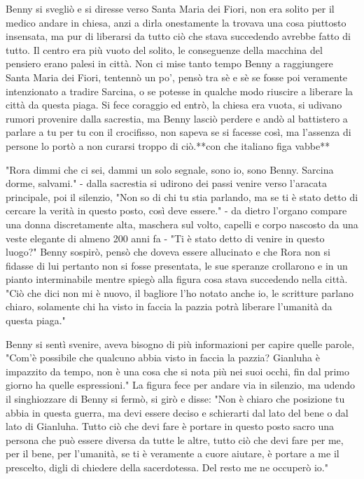 Benny si svegliò e si diresse verso Santa Maria dei Fiori, non era solito per il medico andare in chiesa, anzi a dirla onestamente la trovava una cosa piuttosto insensata, ma pur di liberarsi da tutto ciò che stava succedendo avrebbe fatto di tutto. Il centro era più vuoto del solito, le conseguenze della macchina del pensiero erano palesi in città. Non ci mise tanto tempo Benny a raggiungere Santa Maria dei Fiori, tentennò un po', pensò tra sè e sè se fosse poi veramente intenzionato a tradire Sarcina, o se potesse in qualche modo riuscire a liberare la città da questa piaga. Si fece coraggio ed entrò, la chiesa era vuota, si udivano rumori provenire dalla sacrestia, ma Benny lasciò perdere e andò al battistero a parlare a tu per tu con il crocifisso, non sapeva se si facesse così, ma l'assenza di persone lo portò a non curarsi troppo di ciò.**con che italiano figa vabbe**

"Rora dimmi che ci sei, dammi un solo segnale, sono io, sono Benny. Sarcina dorme, salvami." - dalla sacrestia si udirono dei passi venire verso l'aracata principale, poi il silenzio, "Non so di chi tu stia parlando, ma se ti è stato detto di cercare la verità in questo posto, così deve essere." - da dietro l'organo compare una donna discretamente alta, maschera sul volto, capelli e corpo nascosto da una veste elegante di almeno 200 anni fa - "Ti è stato detto di venire in questo luogo?" 
Benny sospirò, pensò che doveva essere allucinato e che Rora non si fidasse di lui pertanto non si fosse presentata, le sue speranze crollarono e in un pianto interminabile mentre spiegò alla figura cosa stava succedendo nella città.
"Ciò che dici non mi è nuovo, il bagliore l'ho notato anche io, le scritture parlano chiaro, solamente chi ha visto in faccia la pazzia potrà liberare l'umanità da questa piaga."

Benny si sentì svenire, aveva bisogno di più informazioni per capire quelle parole, "Com'è possibile che qualcuno abbia visto in faccia la pazzia? Gianluha è impazzito da tempo, non è una cosa che si nota più nei suoi occhi, fin dal primo giorno ha quelle espressioni."
La figura fece per andare via in silenzio, ma udendo il singhiozzare di Benny si fermò, si girò e disse: "Non è chiaro che posizione tu abbia in questa guerra, ma devi essere deciso e schierarti dal lato del bene o dal lato di Gianluha. Tutto ciò che devi fare è portare in questo posto sacro una persona che può essere diversa da tutte le altre, tutto ciò che devi fare per me, per il bene, per l'umanità, se ti è veramente a cuore aiutare, è portare a me il prescelto, digli di chiedere della sacerdotessa. Del resto me ne occuperò io."

